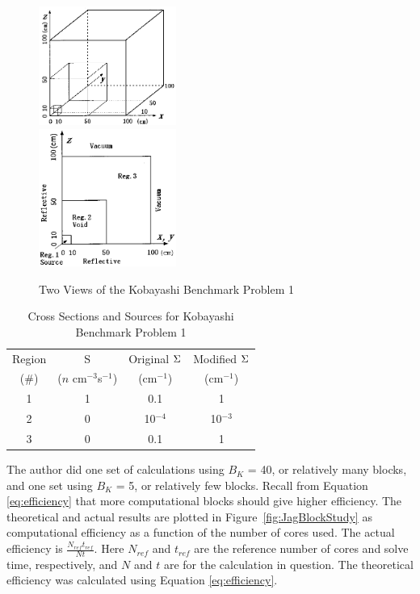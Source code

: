 \begin{figure}[!ht]	
  \begin{center}
    \includegraphics [width=0.4\textwidth, height=0.3\textheight ] {Kobayashi1} \\
    \includegraphics [width=0.4\textwidth, height=0.3\textheight ] {Kobayashi1Front}
  \end{center}
  \caption{Two Views of the Kobayashi Benchmark Problem 1}
  \label{fig:Kob1}
\end{figure}

\begin{table}[h]
  \caption{Cross Sections and Sources for Kobayashi Benchmark Problem 1}
  \centering
  \begin{tabular}{|c|c|c|c|}
    \hline
    Region & S & Original $\Sigma$ & Modified $\Sigma$ \\
    (\#) & ($n$ cm$^{-3}$s$^{-1}$) & (cm$^{-1}$) & (cm$^{-1}$) \\
    \hline
    1 & 1 & 0.1 & 1 \\
    2 & 0 & 10$^{-4}$ & 10$^{-3}$ \\
    3 & 0 & 0.1 & 1 \\
    \hline
  \end{tabular}
  \label{tab:Kob1xsecs}
\end{table}

The author did one set of calculations using $B_{K}$ = 40, or relatively many blocks, and one set using $B_{K}$ = 5, or relatively few blocks. Recall from Equation \eqref{eq:efficiency} that more computational blocks should give higher efficiency. The theoretical and actual results are plotted in Figure~\ref{fig:JagBlockStudy} as computational efficiency as a function of the number of cores used. The actual efficiency is $\frac{N_{ref}t_{ref}}{Nt}$. Here $N_{ref}$ and $t_{ref}$ are the reference number of cores and solve time, respectively, and $N$ and $t$ are for the calculation in question.  The theoretical efficiency was calculated using Equation \eqref{eq:efficiency}.

